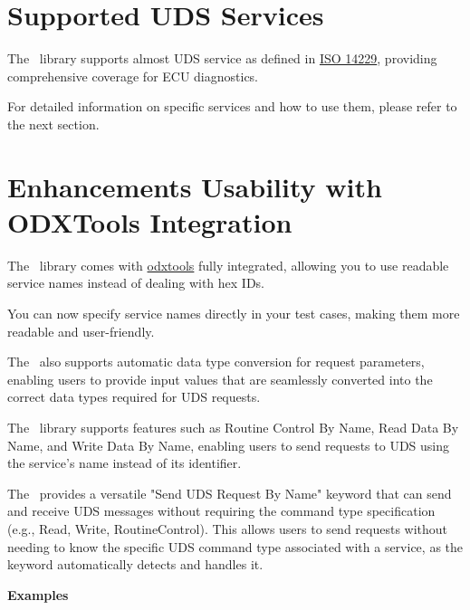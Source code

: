 \section{Supported UDS Services}
The \pkg\ library supports almost UDS service as defined in 
\href{https://automotive.wiki/index.php/ISO_14229}{ISO 14229}, 
providing comprehensive coverage for ECU diagnostics.

For detailed information on specific services and how to use them, please refer 
to the next section.

\section{Enhancements Usability with ODXTools Integration}
The \pkg\ library comes with 
\href{https://github.com/mercedes-benz/odxtools}{odxtools} fully integrated, 
allowing you to use readable service names instead of dealing with hex IDs.

You can now specify service names directly in your test cases, 
making them more readable and user-friendly.

The \pkg\ also supports automatic data type conversion for request parameters, 
enabling users to provide input values that are seamlessly converted into the 
correct data types required for UDS requests.

The \pkg\ library supports features such as Routine Control By Name, 
Read Data By Name, and Write Data By Name, enabling users to send requests to 
UDS using the service's name instead of its identifier.

The \pkg\ provides a versatile "Send UDS Request By Name" keyword that can send 
and receive UDS messages without requiring the command type specification 
(e.g., Read, Write, RoutineControl). This allows users to send requests without 
needing to know the specific UDS command type associated with a service, as the 
keyword automatically detects and handles it.

{\large\textbf{Examples}}

